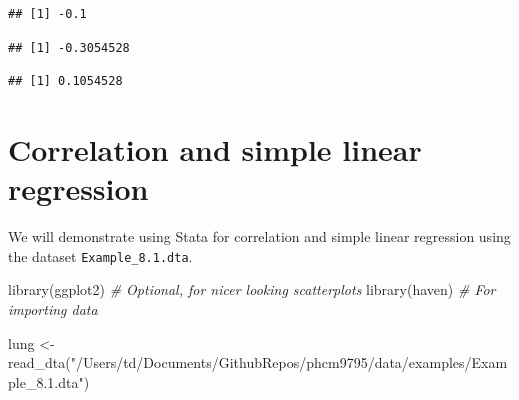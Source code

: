 \documentclass[
]{memoir}
\newenvironment{Shaded}{\begin{snugshade}}{\end{snugshade}}
\newcommand{\CommentTok}[1]{\textcolor[rgb]{0.56,0.35,0.01}{\textit{#1}}}
\newcommand{\FunctionTok}[1]{\textcolor[rgb]{0.00,0.00,0.00}{#1}}
\newcommand{\NormalTok}[1]{#1}
\newcommand{\OtherTok}[1]{\textcolor[rgb]{0.56,0.35,0.01}{#1}}
\newcommand{\SpecialCharTok}[1]{\textcolor[rgb]{0.00,0.00,0.00}{#1}}
\newcommand{\StringTok}[1]{\textcolor[rgb]{0.31,0.60,0.02}{#1}}
\begin{document}
\begin{Shaded}
\end{Shaded}

\begin{verbatim}
## [1] -0.1
\end{verbatim}

\begin{Shaded}
\end{Shaded}

\begin{verbatim}
## [1] -0.3054528
\end{verbatim}

\begin{Shaded}
\end{Shaded}

\begin{verbatim}
## [1] 0.1054528
\end{verbatim}

\hypertarget{correlation-and-simple-linear-regression}{%
\chapter{Correlation and simple linear regression}\label{correlation-and-simple-linear-regression}}

We will demonstrate using Stata for correlation and simple linear regression using the dataset \texttt{Example\_8.1.dta}.

\begin{Shaded}
\begin{Highlighting}[]
\FunctionTok{library}\NormalTok{(ggplot2)   }\CommentTok{\# Optional, for nicer looking scatterplots}
\FunctionTok{library}\NormalTok{(haven)     }\CommentTok{\# For importing data}

\NormalTok{lung }\OtherTok{\textless{}{-}} \FunctionTok{read\_dta}\NormalTok{(}\StringTok{"/Users/td/Documents/GithubRepos/phcm9795/data/examples/Example\_8.1.dta"}\NormalTok{)}
\end{Highlighting}
\end{Shaded}
\end{document}
